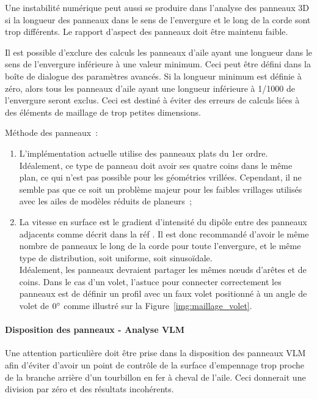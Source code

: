 \documentclass[a4paper,twoside,12pt,dvips]{article}
\begin{document}
Une instabilité numérique peut aussi se produire dans l’analyse des panneaux 3D si la longueur des panneaux dans le sens de l’envergure et le long de la corde sont trop différents. Le rapport d’aspect des panneaux doit être maintenu faible.

Il est possible d’exclure des calculs les panneaux d’aile ayant une longueur dans le sens de l’envergure inférieure à une valeur minimum. Ceci peut être défini dans la boîte de dialogue des paramètres avancés. Si la longueur minimum est définie à zéro, alors tous les panneaux d’aile ayant une longueur inférieure à 1/1000 de l’envergure seront exclus. Ceci est destiné à éviter des erreurs de calculs liées à des éléments de maillage de trop petites dimensions.

Méthode des panneaux~:
\begin{enumerate}
	\item L’implémentation actuelle utilise des panneaux plats du 1er ordre.\\
	Idéalement, ce type de panneau doit avoir ses quatre coins dans le même 
	plan, ce qui n’est pas possible pour les géométries vrillées. Cependant, il
	ne semble pas que ce soit un problème majeur pour les faibles vrillages 
	utilisés avec les ailes de modèles réduits de planeurs~;
	\item La vitesse en surface est le gradient d’intensité du dipôle entre des
	panneaux adjacents comme décrit dans la réf \cite{Maskew}. Il est donc 
	recommandé d’avoir le même nombre de panneaux le long de la corde pour toute
	l’envergure, et le même type de distribution, soit uniforme, soit 
	sinusoïdale.\\
	Idéalement, les panneaux devraient partager les mêmes nœuds d’arêtes et de 
	coins. Dans le cas d’un volet, l’astuce pour connecter correctement les 
	panneaux est de définir un profil avec un faux volet positionné à un angle 
	de volet de $0\degree$ comme illustré sur la 
	Figure~\ref{img:maillage_volet}.
\end{enumerate}

\clearpage

\paragraph{Disposition des panneaux - Analyse VLM}

Une attention particulière doit être prise dans la disposition des panneaux VLM afin d’éviter d’avoir un point de contrôle de la surface d’empennage trop proche de la branche arrière d’un tourbillon en fer à cheval de l’aile. Ceci donnerait une division par zéro et des résultats incohérents. 
\end{document}

